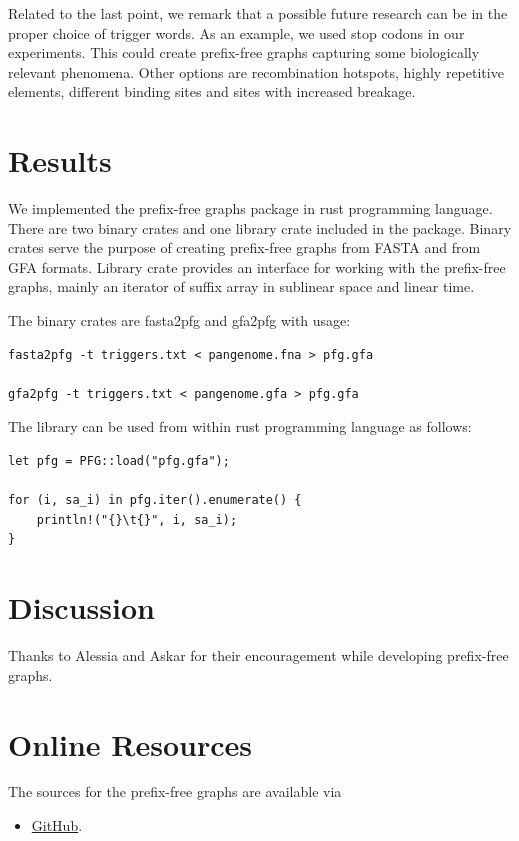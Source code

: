 \documentclass[twocolumn]{ceurart}
\begin{document}
Related to the last point, we remark that a possible future research can be in
the proper choice of trigger words.
As an example, we used stop codons in our experiments.
This could create prefix-free graphs capturing some biologically relevant phenomena.
Other options are recombination hotspots, highly repetitive elements, different
binding sites and sites with increased breakage.

\section{Results}
We implemented the prefix-free graphs package in rust programming language.
There are two binary crates and one library crate included in the package.
Binary crates serve the purpose of creating prefix-free graphs from FASTA and from GFA formats.
Library crate provides an interface for working with the prefix-free graphs,
mainly an iterator of suffix array in sublinear space and linear time.

The binary crates are fasta2pfg and gfa2pfg with usage:
\begin{verbatim}
fasta2pfg -t triggers.txt < pangenome.fna > pfg.gfa

gfa2pfg -t triggers.txt < pangenome.gfa > pfg.gfa
\end{verbatim}

The library can be used from within rust programming language as follows:

\begin{verbatim}
let pfg = PFG::load("pfg.gfa");

for (i, sa_i) in pfg.iter().enumerate() {
    println!("{}\t{}", i, sa_i);
}
\end{verbatim}

\section{Discussion}

\begin{acknowledgments}
    Thanks to Alessia and Askar for their encouragement while developing prefix-free graphs.
\end{acknowledgments}



\appendix

\section{Online Resources}

The sources for the prefix-free graphs are available via
\begin{itemize}
\item \href{https://github.com/andynet/pfg}{GitHub}.
\end{itemize}
\end{document}

